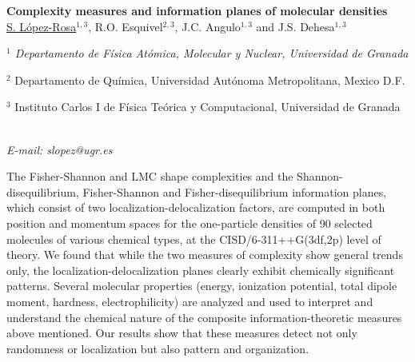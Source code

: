 \newpage
\setcounter{figure}{0}
\begin{center}
{\bf \Large
Complexity measures and information planes of molecular densities
}
\\
\vspace{0.5cm}
\underline{S. López-Rosa}$^{1,3}$, R.O. Esquivel$^{2,3}$, J.C. Angulo$^{1,3}$ and J.S. Dehesa$^{1,3}$
\\
\vspace{0.5cm}
{\it 
$^{1}$ Departamento de Física Atómica, Molecular y Nuclear, Universidad de Granada

$^{2}$ Departamento de Química, Universidad Autónoma Metropolitana, Mexico D.F.

$^{3}$ Instituto Carlos I de Física Teórica y Computacional, Universidad de Granada
}
\\
\vspace{0.5cm}
{\it E-mail: slopez@ugr.es}
\\
\vspace{0.5cm}
\end{center}
The Fisher-Shannon and LMC shape complexities and the Shannon-disequilibrium, Fisher-Shannon
and Fisher-disequilibrium information planes, which consist of two localization-delocalization factors,
are computed in both position and momentum spaces for the one-particle densities of 90 selected molecules of
various chemical types, at the CISD/6-311++G(3df,2p) level of theory.
We found that while the two measures of complexity show general trends only, the localization-delocalization
planes clearly exhibit chemically significant patterns. Several molecular properties
(energy, ionization potential, total dipole moment, hardness, electrophilicity) are analyzed and used
to interpret and understand the chemical nature of the composite information-theoretic measures
above mentioned. Our results show that these measures detect not only randomness or localization
but also pattern and organization.

